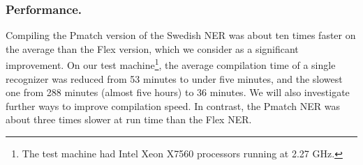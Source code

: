 \documentclass{llncs}
\begin{document}



\subsubsection{Performance.}

Compiling the Pmatch version of the Swedish NER was about ten times
faster on the average than the Flex version, which we consider as a
significant improvement. On our test
machine\footnote{The test machine had Intel Xeon X7560 processors
  running at 2.27 GHz.}, the average compilation time of
a single recognizer was reduced from 53 minutes to under five minutes,
and the slowest one from 288 minutes (almost five hours) to 36 minutes.
We will also investigate further
ways to improve compilation speed. In contrast, the Pmatch NER was
about three times slower at run time than the Flex NER.
\end{document}
